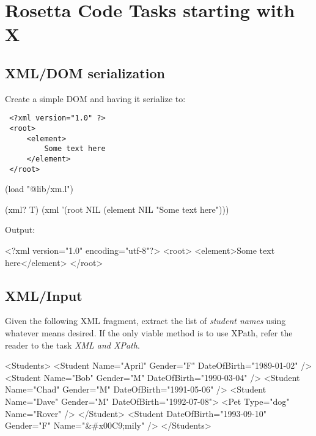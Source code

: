 %
%
%

\chapter{Rosetta Code Tasks starting with X}

\section*{XML/DOM serialization}

Create a simple DOM and having it serialize to:

\begin{verbatim}
 <?xml version="1.0" ?>
 <root>
     <element>
         Some text here
     </element>
 </root>
\end{verbatim}


\begin{wideverbatim}

(load "@lib/xm.l")

(xml? T)
(xml '(root NIL (element NIL "Some text here")))

Output:

<?xml version="1.0" encoding="utf-8"?>
<root>
   <element>Some text here</element>
</root>

\end{wideverbatim}

\pagebreak{}
\section*{XML/Input}

Given the following XML fragment, extract the list of \emph{student
  names} using whatever means desired. If the only viable method is to
use XPath, refer the reader to the task \emph{XML and XPath}.

\begin{wideverbatim}
<Students>
  <Student Name="April" Gender="F" DateOfBirth="1989-01-02" />
  <Student Name="Bob" Gender="M"  DateOfBirth="1990-03-04" />
  <Student Name="Chad" Gender="M"  DateOfBirth="1991-05-06" />
  <Student Name="Dave" Gender="M"  DateOfBirth="1992-07-08">
    <Pet Type="dog" Name="Rover" />
  </Student>
  <Student DateOfBirth="1993-09-10" Gender="F" Name="&#x00C9;mily" />
</Students>
\end{wideverbatim}


